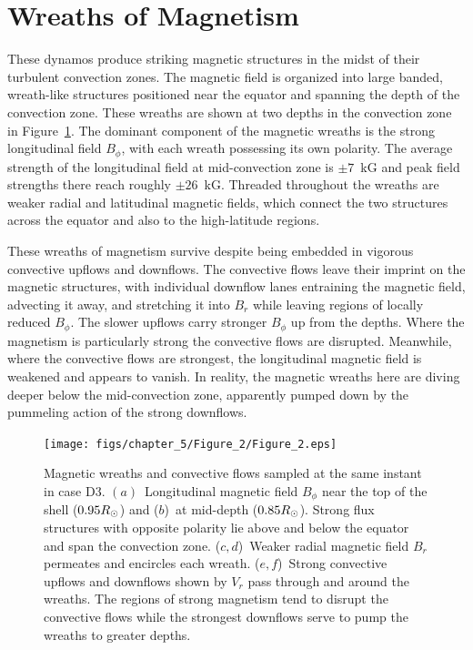 \section{Wreaths of Magnetism}
\label{sec:wreaths}

These dynamos produce striking magnetic structures in the midst of
their turbulent convection zones.  The magnetic field is organized
into large banded, wreath-like structures positioned near the equator
and spanning the depth of the convection zone.  These wreaths are shown
at two depths in the convection zone in Figure~\ref{fig:case_D3_many_depths}.   
The dominant component of the magnetic wreaths is the strong longitudinal
field $B_\phi$, with each wreath possessing its own polarity.  The average
strength of the longitudinal field at mid-convection zone is $\pm 7$~kG 
and peak field strengths there reach roughly $\pm 26$~kG.  
Threaded throughout the wreaths are weaker radial and latitudinal magnetic
fields, which connect the two structures across the equator and also
to the high-latitude regions.  

These wreaths of magnetism survive despite being embedded in vigorous
convective upflows and downflows.  The
convective flows leave their imprint on the magnetic structures,  
with individual downflow lanes entraining the
magnetic field, advecting it away, and stretching it into $B_r$
while leaving regions of locally reduced $B_\phi$. The slower upflows
carry stronger $B_\phi$ up from the depths.  Where the magnetism is
particularly strong the convective flows are disrupted.
Meanwhile, where the convective flows are strongest, the longitudinal
magnetic field is weakened and appears to 
vanish.  In  reality, the magnetic wreaths here are
diving deeper below the mid-convection zone, apparently pumped
down by the pummeling action of the strong downflows.  

\begin{figure}
  \begin{center}
    \texttt{[image: figs/chapter\_5/Figure\_2/Figure\_2.eps]}
  \end{center}
  \caption[Magnetic and convective structures in case D3 at two depths]
	  {Magnetic wreaths and convective flows sampled at the same instant in
    case D3.   $(a)$~Longitudinal magnetic field $B_\phi$ near the top of the shell
    ($0.95R_\odot$) and ($b$)~at mid-depth ($0.85R_\odot$).  Strong
    flux structures with opposite polarity lie above and below the equator
    and span the convection zone.  ($c,d$)~Weaker radial magnetic
    field $B_r$ permeates and encircles each wreath. ($e,f$)~Strong convective upflows
    and downflows shown by $V_r$ pass through and around
    the wreaths.  The regions of strong magnetism tend to disrupt the
    convective flows while the strongest downflows serve to
    pump the wreaths to greater depths.
  \label{fig:case_D3_many_depths}}
\end{figure}

